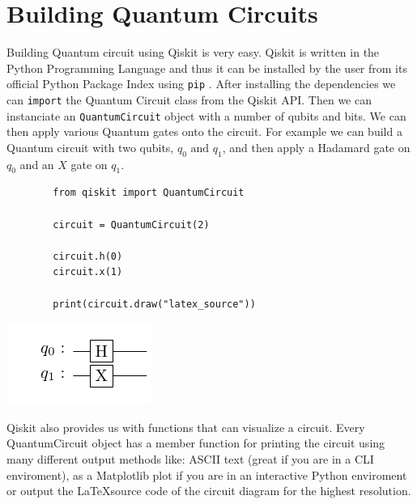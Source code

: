 \section{Building Quantum Circuits}

Building Quantum circuit using Qiskit is very easy. Qiskit is written in the Python Programming Language and thus it can be installed
by the user from its official Python Package Index using \verb|pip| \cite{QiskitPIP}. After installing the dependencies we can
\verb|import| the Quantum Circuit class from the Qiskit API. Then we can instanciate an \verb|QuantumCircuit| object with a number
of qubits and bits. We can then apply various Quantum gates onto the circuit. For example we can build a Quantum circuit with two
qubits, $q_0\text{ and }q_1$, and then apply a Hadamard gate on $q_0$ and an $X$ gate on $q_1$.

\begin{listing}[ht]
    \centering
    \begin{verbatim}
        from qiskit import QuantumCircuit
        
        circuit = QuantumCircuit(2)
        
        circuit.h(0)
        circuit.x(1)
        
        print(circuit.draw("latex_source"))
    \end{verbatim}
    \centering
    \includegraphics{images/4_Qiskit/example_circuit_1.pdf}
    \caption{Building a simple Quantum circuit and its diagram compiled from its \LaTeX source code}
\end{listing}


Qiskit also provides us with functions that can visualize a circuit. Every QuantumCircuit object has a member function for
printing the circuit using many different output methods like: ASCII text (great if you are in a CLI enviroment), as a Matplotlib
plot if you are in an interactive Python enviroment or output the \LaTeX source code of the circuit diagram for the highest resolution.